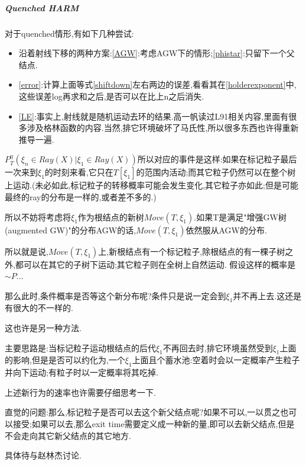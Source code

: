 				\subparagraph*{Quenched HARM}
				\quad

					对于quenched情形,有如下几种尝试:

					\begin{itemize}
						\label{trial}
						\item 沿着射线下移的两种方案:\ref{AGW}:考虑AGW下的情形;\ref{phistar}:只留下一个父结点.
						\item \ref{error}:计算上面等式\ref{shiftdown}左右两边的误差,看看其在\ref{holderexponent}中,这些误差log再求和之后,是否可以在比上n之后消失.
						\item \ref{LE}:事实上,射线就是随机运动去环的结果.高一帆读过L91相关内容,里面有很多涉及格林函数的内容.当然,排它环境破坏了马氏性,所以很多东西也许得重新推导一遍.
					\end{itemize}

					\begin{tri}[考虑AGW下的情形]
						\label{AGW}
						$P^{\eta}_T( \xi_n \in Ray(X) | \xi_1 \in Ray(X))$所以对应的事件是这样:如果在标记粒子最后一次来到$\xi_1$的时刻来看,它只在$T[\xi_1]$的范围内活动;而其它粒子仍然可以在整个树上运动.(未必如此,标记粒子的转移概率可能会发生变化,其它粒子亦如此;但是可能最终的ray的分布是一样的,或者差不多的.)

						所以不妨将考虑将$\xi_1$作为根结点的新树$Move(T,\xi_1)$.如果T是满足"增强GW树(augmented GW)"的分布AGW的话,$Move(T,\xi_1)$依然服从AGW的分布.

						所以就是说,$Move(T,\xi_1)$上,新根结点有一个标记粒子,除根结点的有一棵子树之外,都可以在其它的子树下运动;其它粒子则在全树上自然运动.
						假设这样的概率是$\sim{P}$...

						那么此时,条件概率是否等这个新分布呢?条件只是说一定会到$\xi_1$并不再上去.这还是有很大的不一样的.
					\end{tri}

					\begin{tri}
						\label{phistar}
						这也许是另一种方法.

						主要思路是:当标记粒子运动根结点的后代$\xi_1$不再回去时,排它环境虽然受到$\xi_1$上面的影响,但是是否可以约化为,一个$\xi_1$上面且个蓄水池:空着时会以一定概率产生粒子并向下运动;有粒子时以一定概率将其吃掉.

						上述新行为的速率也许需要仔细思考一下.

						直觉的问题:那么,标记粒子是否可以去这个新父结点呢?如果不可以,一以贯之也可以接受;如果可以去,那么exit time需要定义成一种新的量,即可以去新父结点,但是不会走向其它新父结点的其它地方.

						具体待与赵林杰讨论.
					\end{tri}

